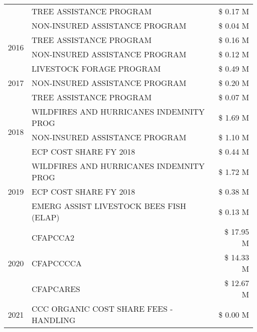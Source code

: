 \begin{tabular}{llr}
 & TREE ASSISTANCE PROGRAM & \$ 0.17 M \\
 & NON-INSURED ASSISTANCE PROGRAM & \$ 0.04 M \\
\cline{1-3}
\multirow[t]{2}{*}{2016} & TREE ASSISTANCE PROGRAM                       & \$ 0.16 M \\
 & NON-INSURED ASSISTANCE PROGRAM                & \$ 0.12 M \\
\cline{1-3}
\multirow[t]{3}{*}{2017} & LIVESTOCK FORAGE PROGRAM & \$ 0.49 M \\
 & NON-INSURED ASSISTANCE PROGRAM & \$ 0.20 M \\
 & TREE ASSISTANCE PROGRAM & \$ 0.07 M \\
\cline{1-3}
\multirow[t]{3}{*}{2018} & WILDFIRES AND HURRICANES INDEMNITY PROG & \$ 1.69 M \\
 & NON-INSURED ASSISTANCE PROGRAM & \$ 1.10 M \\
 & ECP COST SHARE FY 2018 & \$ 0.44 M \\
\cline{1-3}
\multirow[t]{3}{*}{2019} & WILDFIRES AND HURRICANES INDEMNITY PROG & \$ 1.72 M \\
 & ECP COST SHARE FY 2018 & \$ 0.38 M \\
 & EMERG ASSIST LIVESTOCK BEES FISH (ELAP) & \$ 0.13 M \\
\cline{1-3}
\multirow[t]{3}{*}{2020} & CFAPCCA2 & \$ 17.95 M \\
 & CFAPCCCCA & \$ 14.33 M \\
 & CFAPCARES & \$ 12.67 M \\
\cline{1-3}
2021 & CCC ORGANIC COST SHARE FEES - HANDLING & \$ 0.00 M \\
\cline{1-3}
\bottomrule
\end{tabular}
